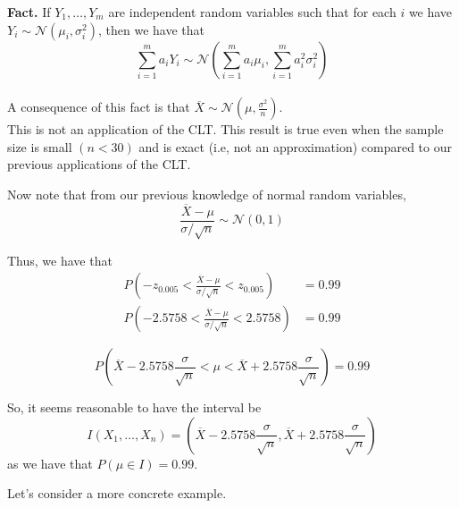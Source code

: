 \textbf{Fact. }If $Y_1, \ldots, Y_m$ are independent random variables such that for each $i$ we have $Y_i \sim \mathcal{N}(\mu_i, \sigma^2_i)$, then we have that
\[
\sum_{i=1}^m a_i Y_i \sim 
\mathcal{N}\left(
    \sum_{i=1}^m a_i \mu_i,
    \sum_{i=1}^m a_i^2 \sigma^2_i
\right)
\]\\

A consequence of this fact is that $\overline{X} \sim \mathcal{N}(\mu, \frac{\sigma^2}{n})$.\\

\note This is not an application of the CLT. This result is true even when the sample size is small $(n<30)$ and is exact (i.e, not an approximation) compared to our previous applications of the CLT.

Now note that from our previous knowledge of normal random variables,
\[
\frac{\overline{X} - \mu}{\sigma / \sqrt{n}} \sim \mathcal{N}(0,1)
\]

Thus, we have that
\begin{align*}
    P\left(-z_{0.005} < \frac{\overline{X}-\mu}{\sigma/\sqrt{n}}< z_{0.005} \right ) &= 0.99 \\
    P\left(-2.5758 < \frac{\overline{X} - \mu}{\sigma/\sqrt{n}} < 2.5758\right) &= 0.99
\end{align*}

\[
P\left(\overline{X} - 2.5758 \frac{\sigma}{\sqrt{n}} < \mu < \overline{X} + 2.5758\frac{\sigma}{\sqrt{n}}\right) = 0.99
\]

So, it seems reasonable to have the interval be 
\[
I(X_1, \ldots, X_n) = 
\left(
\overline{X} - 2.5758 \frac{\sigma}{\sqrt{n}},
\overline{X} + 2.5758 \frac{\sigma}{\sqrt{n}}
\right)
\]
as we have that $P(\mu \in I) = 0.99$.

Let's consider a more concrete example. 


